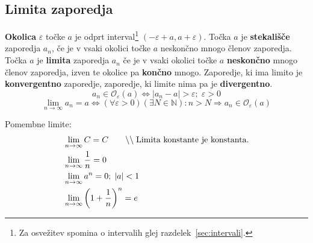 \documentclass[a4paper,oneside,12pt,fleqn]{article}
\def\N{\ensuremath{\mathbb N}}
\newcommand{\comment}[1]{\ensuremath{\qquad\backslash\backslash\;}\textnormal{#1}}
\def\limi{\displaystyle\lim_{n\to\infty}} %
\renewcommand\implies\Rightarrow
\renewcommand\iff\Leftrightarrow
\numberwithin{equation}{section}
\begin{document}
\subsection{Limita zaporedja}
\label{sec:zap:lim}
\textbf{Okolica} $\varepsilon$ točke $a$ je odprt interval\footnote{Za osvežitev spomina o
intervalih glej razdelek~\ref{sec:intervali}.} $(-\varepsilon+a, a+\varepsilon)$. Točka
$a$ je \textbf{stekališče} zaporedja $a_n$, če je v vsaki okolici točke $a$ neskončno mnogo členov
zaporedja. Točka $a$ je \textbf{limita} zaporedja $a_n$ če je v vsaki okolici točke $a$
\textbf{neskončno} mnogo členov zaporedja, izven te okolice pa \textbf{končno} mnogo. Zaporedje, ki ima limito je
\textbf{konvergentno} zaporedje, zaporedje, ki limite nima pa je \textbf{divergentno}. 
\[ a_n \in \mathcal{O}_{\varepsilon}(a) \iff |a_n - a| > \varepsilon; \; \varepsilon > 0 \]
\[ \limi a_n = a \iff (\forall \varepsilon > 0)(\exists N \in \N): n > N \implies a_n \in
\mathcal{O}_{\varepsilon}(a) \]

Pomembne limite:
\begin{align}
  & \limi C = C \comment{Limita konstante je konstanta.} \label{eq:zap:lim:konst} \\
  & \limi \frac{1}{n} = 0  \label{eq:zap:lim:1n} \\
  & \limi a^n = 0; \; \left|a\right| < 1 \label{eq:zap:lim:an} \\
  & \limi \left(1 + \frac{1}{n}\right)^n = e \label{eq:zap:lim:e} \\
\end{align}
\end{document}
